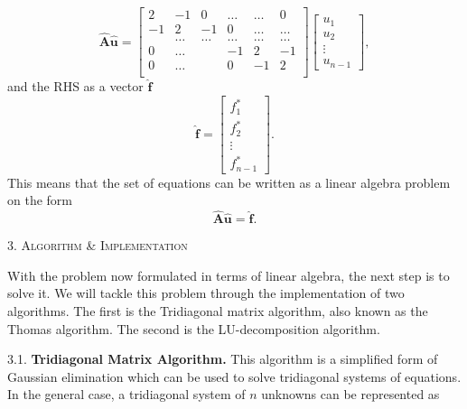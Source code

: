\documentclass[a4paper,10pt]{article}
\begin{document}
$$
\mathbf{\hat{A}} \mathbf{\hat{u}} = 
\begin{bmatrix}
                           2& -1& 0 &\dots   & \dots &0 \\
                           -1 & 2 & -1 &0 &\dots &\dots \\
                           & \dots   & \dots &\dots   &\dots & \dots \\
                           0&\dots   &  &-1 &2& -1 \\
                           0&\dots    &  & 0  &-1 & 2 \\
\end{bmatrix}
\begin{bmatrix}
	 u_1\\
          u_2 \\
   	\vdots \\
 	u_{n-1}
\end{bmatrix},
$$
and the RHS as a vector $\mathbf{\hat{f}}$
$$ \mathbf{\hat{f}} =  
\begin{bmatrix}
	 f_1^*\\
          f_2^* \\
   	\vdots \\
 	f_{n-1}^* 
\end{bmatrix}. $$
This means that the set of equations can be written as a linear algebra problem on the form
$$ \mathbf{\hat{A}} \mathbf{\hat{u}} = \mathbf{\hat{f}}.$$

\bigskip

\begin{center}
\textsc{3. Algorithm \& Implementation }
\end{center}
With the problem now formulated in terms of linear algebra, the next step is to solve it. We will tackle this problem through the implementation of two algorithms. The first is the Tridiagonal matrix algorithm, also known as the Thomas algorithm. The second is the LU-decomposition algorithm. 
\bigskip

3.1. \textbf{Tridiagonal Matrix Algorithm.} This algorithm is a simplified form of Gaussian elimination which can be used to solve tridiagonal systems of equations. In the general case, a tridiagonal system of $n$ unknowns can be represented as 
\end{document}
